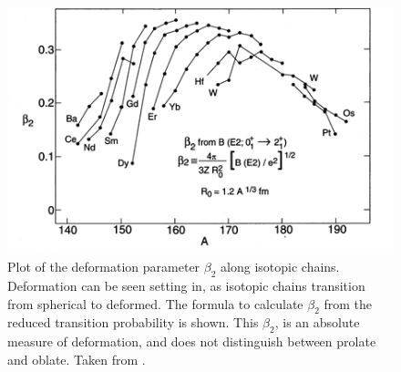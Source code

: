 \begin{figure}
    \centering
    \includegraphics[scale=2]{Introduction_Figs/DeformationParamCasten.png}
    \caption{Plot of the deformation parameter $\beta_2$ along isotopic chains. Deformation can be seen setting in, as isotopic chains transition from spherical to deformed. The formula to calculate $\beta_2$ from the reduced transition probability is shown. This $\beta_2$, is an absolute measure of deformation, and does not distinguish between prolate and oblate. Taken from \citep{casten90:_structure}.}
    \label{fig:beta_by_isotope}
\end{figure}